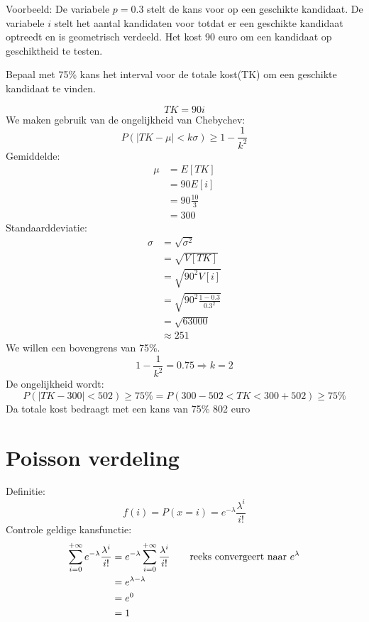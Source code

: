 \documentclass[12pt]{report}
\newcommand{\example}[2]{
      \hrulefill
      
      Voorbeeld: #1
      
      #2
      
      \hrulefill
  }
\begin{document}
\example{ 
    De variabele $p = 0.3$ stelt de kans voor op een geschikte kandidaat. De variabele $i$ stelt het aantal kandidaten voor totdat er een geschikte kandidaat optreedt en is geometrisch verdeeld. Het kost 90 euro om een kandidaat op geschiktheid te testen. 
    
    Bepaal met 75\% kans het interval voor de totale kost(TK) om een geschikte kandidaat te vinden.
}{
    $$TK = 90i$$
    We maken gebruik van de ongelijkheid van Chebychev:
    $$P(|TK - \mu| < k\sigma) \geq 1 - \frac{1}{k^2}$$
    Gemiddelde:
    \begin{equation*}
     \begin{split}
      \mu & = E[TK] \\
          & = 90E[i] \\
          & = 90\frac{10}{3} \\
          & = 300
     \end{split}
    \end{equation*}
    Standaarddeviatie:
    \begin{equation*}
     \begin{split}
      \sigma & = \sqrt{\sigma^2} \\
             & = \sqrt{V[TK]} \\
             & = \sqrt{90^2V[i]} \\
             & = \sqrt{90^2\frac{1 - 0.3}{0.3^2}} \\
             & = \sqrt{63000} \\
             & \approx 251
     \end{split}
    \end{equation*}
    We willen een bovengrens van 75\%.
    $$1 - \frac{1}{k^2} = 0.75 \Rightarrow k = 2$$
    De ongelijkheid wordt:
    $$P(|TK - 300| < 502) \geq 75\% = P(300 - 502 < TK < 300 + 502) \geq 75\%$$
    Da totale kost bedraagt met een kans van 75\% 802 euro

}

\section{Poisson verdeling}
Definitie:
$$f(i) = P(x = i) = e^{-\lambda}\frac{\lambda^i}{i!}$$
Controle geldige kansfunctie:
\begin{equation*}
 \begin{split}
  \sum_{i=0}^{+\infty}e^{-\lambda}\frac{\lambda^i}{i!} & = e^{-\lambda}\sum_{i=0}^{+\infty}\frac{\lambda^i}{i!} \qquad \hbox{reeks convergeert naar } e^{\lambda}\\
  & = e^{\lambda - \lambda} \\
  & = e^{0} \\
  & = 1
 \end{split}
\end{equation*}
\end{document}

